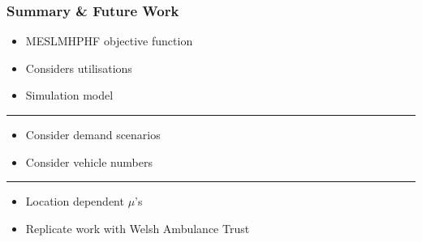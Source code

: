 \documentclass[xcolor={table}]{beamer}
\begin{document}


\begin{frame}
\frametitle{Summary \& Future Work}
\begin{itemize}
  \item MESLMHPHF objective function
  \item Considers utilisations
  \item Simulation model
\end{itemize}

\rule{\textwidth}{0.5pt}

\begin{itemize}
  \item Consider demand scenarios
  \item Consider vehicle numbers
\end{itemize}

\rule{\textwidth}{0.5pt}

\begin{itemize}
  \item Location dependent $\mu$'s
  \item Replicate work with Welsh Ambulance Trust
\end{itemize}

\end{frame}


\frame{\titlepage}
\end{document}
